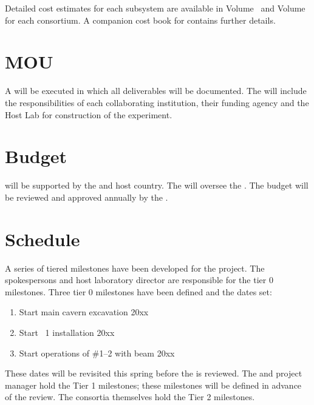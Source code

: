 Detailed cost estimates for each subsystem are available in
  Volume~\volnumbersp\:  and
Volume~\volnumberdp\:  for each consortium. A companion
cost book for  contains further details.

\section{MOU}
\label{sec:fdsp-coord-mou}

A  will be executed in which all deliverables will be
documented. The  will include the responsibilities of each
collaborating institution, their funding agency and the Host Lab for 
construction of the experiment.

\section{Budget}
\label{sec:fdsp-coord-budget}

  will be supported by the
 and host country. The  will oversee
the .  The  budget will be reviewed and
approved annually by the .

\section{Schedule}
\label{sec:fdsp-coord-controls}

A series of tiered milestones have been developed for the 
project. The spokespersons and host laboratory director are
responsible for the tier 0 milestones. Three tier 0 milestones have
been defined and the dates set:
\begin{enumerate}
\item Start main cavern excavation \hspace{2.58in} 20xx
\item Start ~1 installation \hspace{2.1in} 20xx
\item Start operations of  \#1--2 with beam \hspace{0.8in} 20xx
\end{enumerate}
These dates will be revisited this spring before the  is reviewed. The
 and  project manager hold the Tier 1
milestones; these milestones will be defined in advance of the
 review. The consortia themselves hold the Tier 2
milestones.

